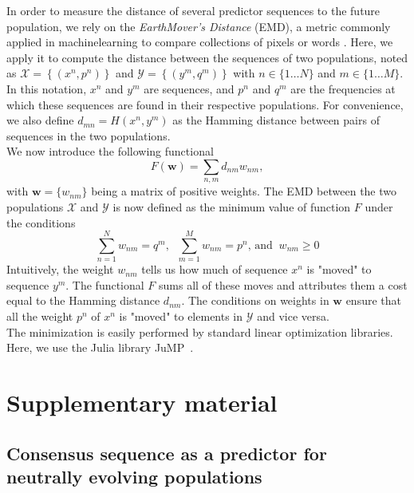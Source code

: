\documentclass{article}
\begin{document}
	In order to measure the distance of several predictor sequences to the future population, we rely on the \emph{EarthMover's Distance} (EMD), a metric commonly applied in machinelearning to compare collections of pixels or words \cite{710701,10.5555/3045118.3045221}. Here, we apply it to compute the distance between the sequences of two populations, noted as $\mathcal{X} = \left\{(x^n, p^n)\right\}$ and $\mathcal{Y}=\left\{(y^m,q^m)\right\}$ with $n\in\{1\ldots N\}$ and $m\in\{1\ldots M\}$. In this notation, $x^n$ and $y^m$ are sequences, and $p^n$ and $q^m$ are the frequencies at which these sequences are found in their respective populations. For convenience, we also define $d_{mn} = H(x^n,y^m)$ as the Hamming distance between pairs of sequences in the two populations. \\
	We now introduce the following functional
	$$ F(\mathbf{w}) = \sum_{n,m} d_{nm}w_{nm}, $$
	with $\mathbf{w} = \{w_{nm}\}$ being a matrix of positive weights. The EMD between the two populations $\mathcal{X}$ and $\mathcal{Y}$ is now defined as the minimum value of function $F$ under the conditions 
	\begin{equation*}
			\sum_{n=1}^N w_{nm} = q^m,\;\; \sum_{m=1}^M w_{nm} = p^n, \,\text{and}\;\; w_{nm}\geq 0
	\end{equation*}
	Intuitively, the weight $w_{nm}$ tells us how much of sequence $x^n$ is "moved" to sequence $y^m$. The functional $F$ sums all of these moves and attributes them a cost equal to the Hamming distance $d_{nm}$. The conditions on weights in $\mathbf{w}$ ensure that all the weight $p^n$ of $x^n$ is "moved" to elements in $\mathcal{Y}$ and vice versa. \\
	The minimization is easily performed by standard linear optimization libraries. Here, we use the Julia library {JuMP}~\cite{DunningHuchetteLubin2017}.





\newpage 

\section*{Supplementary material} %
\label{sec:supplementary_material}

\subsection{Consensus sequence as a predictor for neutrally evolving populations} %
\label{sub:consensus_sequence_as_a_predictor}
	
\end{document}
